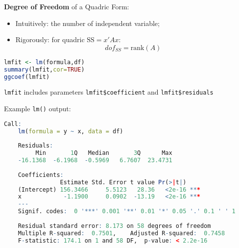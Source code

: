\textbf{Degree of Freedom} of a Quadric Form:
\begin{itemize}[topsep=2pt,itemsep=2pt]
    \item Intuitively: the number of independent variable;
    \item Rigorously: for quadric $ \mathrm{SS}=x'Ax $:
    \begin{equation}\label{EqaDefinitionOfDegreeOfFreedom}
        dof_{SS}=\mathrm{rank}(A)
    \end{equation}
    
    
    
\end{itemize}

     

\begin{rcode}
\begin{lstlisting}[language=R]
lmfit <- lm(formula,df)
summary(lmfit,cor=TRUE)
ggcoef(lmfit)
\end{lstlisting}

    \lstinline|lmfit| includes parameters \lstinline|lmfit$coefficient| and \lstinline|lmfit$residuals|

    Example \lstinline|lm()| output:
\begin{lstlisting}[language=R]
    Call:
    lm(formula = y ~ x, data = df)
    
    Residuals:
         Min       1Q   Median       3Q      Max 
    -16.1368  -6.1968  -0.5969   6.7607  23.4731 
    
    Coefficients:
                Estimate Std. Error t value Pr(>|t|)    
    (Intercept) 156.3466     5.5123   28.36   <2e-16 ***
    x            -1.1900     0.0902  -13.19   <2e-16 ***
    ---
    Signif. codes:  0 '***' 0.001 '**' 0.01 '*' 0.05 '.' 0.1 ' ' 1
    
    Residual standard error: 8.173 on 58 degrees of freedom
    Multiple R-squared:  0.7501,    Adjusted R-squared:  0.7458 
    F-statistic: 174.1 on 1 and 58 DF,  p-value: < 2.2e-16
\end{lstlisting}

\end{rcode}








